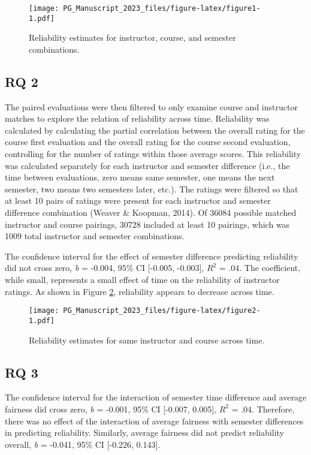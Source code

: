 \documentclass[
  man]{apa7}
\begin{document}
\begin{figure}
\centering
\texttt{[image: PG\_Manuscript\_2023\_files/figure-latex/figure1-1.pdf]}
\caption{\label{fig:figure1}Reliability estimates for instructor, course, and semester combinations.}
\end{figure}

\hypertarget{rq-2-1}{%
\subsection{RQ 2}\label{rq-2-1}}

The paired evaluations were then filtered to only examine course and
instructor matches to explore the relation of reliability across time.
Reliability was calculated by calculating the partial correlation
between the overall rating for the course first evaluation and the
overall rating for the course second evaluation, controlling for the
number of ratings within those average scores. This reliability was
calculated separately for each instructor and semester difference (i.e.,
the time between evaluations, zero means same semester, one means the
next semester, two means two semesters later, etc.). The ratings were
filtered so that at least 10 pairs of ratings were present for each
instructor and semester difference combination (Weaver \& Koopman, 2014). Of
36084 possible matched instructor and course pairings,
30728 included at
least 10 pairings, which was 1009 total instructor and
semester combinations.

The confidence interval for the effect of semester difference predicting
reliability did not cross zero, \emph{b} =
-0.004, 95\% CI
{[}-0.005,
-0.003{]}, \(R^2\) =
.04.
The coefficient, while small, represents a small effect of time on the
reliability of instructor ratings. As shown in Figure
\ref{fig:figure2}, reliability appears to decrease across time.

\begin{figure}
\centering
\texttt{[image: PG\_Manuscript\_2023\_files/figure-latex/figure2-1.pdf]}
\caption{\label{fig:figure2}Reliability estimates for same instructor and course across time.}
\end{figure}

\hypertarget{rq-3-1}{%
\subsection{RQ 3}\label{rq-3-1}}

The confidence interval for the interaction of semester time difference
and average fairness did cross zero, \emph{b} =
-0.001, 95\% CI
{[}-0.007,
0.005{]}, \(R^2\) =
.04.
Therefore, there was no effect of the interaction of average fairness
with semester differences in predicting reliability. Similarly, average
fairness did not predict reliability overall, \emph{b} =
-0.041, 95\% CI
{[}-0.226,
0.143{]}.
\end{document}

